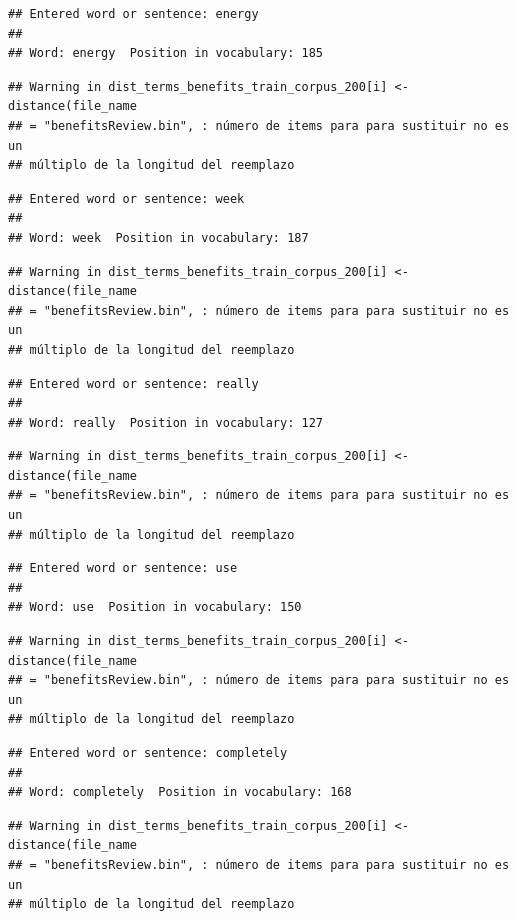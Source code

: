 \documentclass[spanish,]{article}
\begin{document}
\begin{verbatim}
## Entered word or sentence: energy
## 
## Word: energy  Position in vocabulary: 185
\end{verbatim}

\begin{verbatim}
## Warning in dist_terms_benefits_train_corpus_200[i] <- distance(file_name
## = "benefitsReview.bin", : número de items para para sustituir no es un
## múltiplo de la longitud del reemplazo
\end{verbatim}

\begin{verbatim}
## Entered word or sentence: week
## 
## Word: week  Position in vocabulary: 187
\end{verbatim}

\begin{verbatim}
## Warning in dist_terms_benefits_train_corpus_200[i] <- distance(file_name
## = "benefitsReview.bin", : número de items para para sustituir no es un
## múltiplo de la longitud del reemplazo
\end{verbatim}

\begin{verbatim}
## Entered word or sentence: really
## 
## Word: really  Position in vocabulary: 127
\end{verbatim}

\begin{verbatim}
## Warning in dist_terms_benefits_train_corpus_200[i] <- distance(file_name
## = "benefitsReview.bin", : número de items para para sustituir no es un
## múltiplo de la longitud del reemplazo
\end{verbatim}

\begin{verbatim}
## Entered word or sentence: use
## 
## Word: use  Position in vocabulary: 150
\end{verbatim}

\begin{verbatim}
## Warning in dist_terms_benefits_train_corpus_200[i] <- distance(file_name
## = "benefitsReview.bin", : número de items para para sustituir no es un
## múltiplo de la longitud del reemplazo
\end{verbatim}

\begin{verbatim}
## Entered word or sentence: completely
## 
## Word: completely  Position in vocabulary: 168
\end{verbatim}

\begin{verbatim}
## Warning in dist_terms_benefits_train_corpus_200[i] <- distance(file_name
## = "benefitsReview.bin", : número de items para para sustituir no es un
## múltiplo de la longitud del reemplazo
\end{verbatim}
\end{document}
